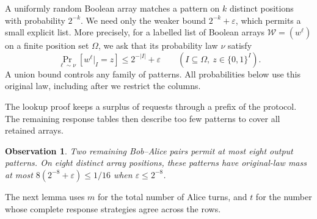 \documentclass[11pt]{article} \usepackage[utf8]{inputenc}
\theoremstyle{plain} \newtheorem{theorem}{Theorem}[section]
\newtheorem{observation}[observation]{Observation}
\theoremstyle{definition} \newaliascnt{definition}{theorem}
\begin{document}
A uniformly random Boolean array matches a pattern on $k$ distinct positions
with probability $2^{-k}$. We need only the weaker bound
$2^{-k}+\varepsilon$, which permits a small explicit list. More precisely,
for a labelled list of Boolean arrays
$\mathcal W=(w^\ell)$ on a finite position set $\Omega$, we ask that its
probability law $\nu$ satisfy
\begin{equation}\label{eq:alternating-pattern}
\Pr_{\ell\sim\nu}[w^\ell|_I=z]\le2^{-|I|}+\varepsilon
\qquad
(I\subseteq\Omega,\ z\in\{0,1\}^I).
\end{equation}
A union bound controls any family of patterns. All probabilities below use
this original law, including after we restrict the columns.

The lookup proof keeps a surplus of requests through a prefix of the protocol.
The remaining response tables then describe too few patterns to cover all
retained arrays.

\begin{observation}\label{ex:pattern-mass}
Two remaining Bob--Alice pairs permit at most eight output patterns. On eight
distinct array positions, these patterns have original-law mass at most
$8(2^{-8}+\varepsilon)\le1/16$ when $\varepsilon\le2^{-8}$.
\end{observation}

The next lemma uses $m$ for the total number of Alice turns, and $t$ for the
number whose complete response strategies agree across the rows.
\end{document}
